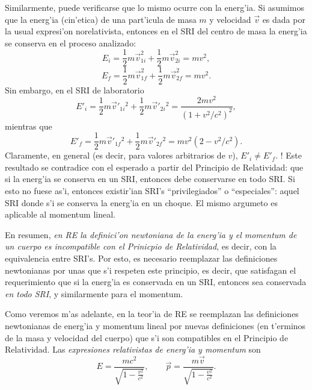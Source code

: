 Similarmente, puede verificarse que lo mismo ocurre con la energ'ia. 
Si asumimos que la energ'ia (cin'etica) de una part'icula de masa $m$ y velocidad $\vec{v}$ es dada por la usual expresi'on norelativista, entonces en el SRI del centro de masa la energ'ia se conserva en el proceso analizado:
\begin{equation}
 E_i=\frac{1}{2}m\vec{v}_{1i}^2+\frac{1}{2}m\vec{v}_{2i}^2=mv^2,
\end{equation}
\begin{equation}
 E_f=\frac{1}{2}m\vec{v}_{1f}^2+\frac{1}{2}m\vec{v}_{2f}^2=mv^2.
\end{equation}
Sin embargo, en el SRI de laboratorio
\begin{equation}
 E'_i=\frac{1}{2}m\vec{v}'_{1i}{}^2+\frac{1}{2}m\vec{v}'_{2i}{}^2=\frac{2mv^2}{(1+v^2/c^2)^2},
\end{equation}
mientras que
\begin{equation}
 E'_f=\frac{1}{2}m\vec{v}'_{1f}{}^2+\frac{1}{2}m\vec{v}'_{2f}{}^2=mv^2\left(2-v^2/c^2\right).
\end{equation}
Claramente, en general (es decir, para valores arbitrarios de $v$),  $ E'_i\neq E'_f$. ! Este resultado se contradice con el esperado a partir del Principio de Relatividad: que si la energ'ia se conserva en un SRI, entonces debe conservarse en todo SRI. Si esto no fuese as'i, entonces existir'ian SRI's ``privilegiados'' o ``especiales'': aquel SRI donde s'i se conserva la energ'ia en un choque. El mismo argumeto es aplicable al momentum lineal.

En resumen, \textit{en RE la definici'on newtoniana de la energ'ia y el momentum de un cuerpo es incompatible con el Prinicpio de Relatividad}, es decir, con la equivalencia entre SRI's. Por esto, es necesario reemplazar las definiciones newtonianas por unas que s'i respeten este principio, es decir, que satisfagan el requerimiento que si la energ'ia es conservada en un SRI, entonces sea conservada \textit{en todo SRI}, y similarmente para el momentum.

Como veremos m'as adelante, en la teor'ia de RE se reemplazan las definiciones newtonianas de energ'ia y momentum lineal por nuevas definiciones (en t'erminos de la masa y velocidad del cuerpo) que s'i son compatibles en el Principio de Relatividad. Las \textit{expresiones relativistas de energ'ia y momentum} son
\begin{equation}
E=\frac{mc^2}{\sqrt{1-\frac{v^2}{c^2}}}, \qquad \vec{p}=\frac{m\vec{v}}{\sqrt{1-\frac{v^2}{c^2}}}.
\end{equation}

